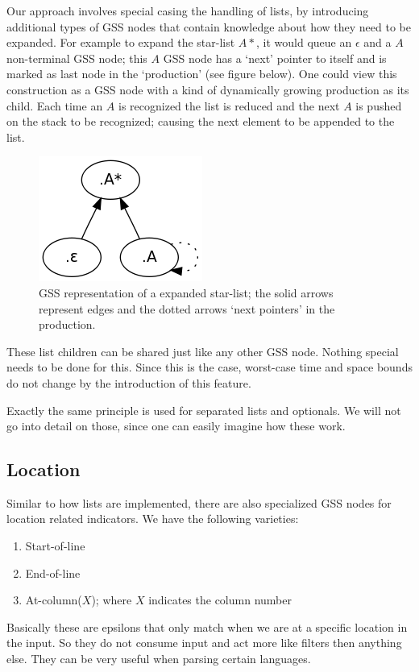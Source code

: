 \documentclass[a4paper,10pt]{article}
\begin{document}
Our approach involves special casing the handling of lists, by introducing additional types of GSS nodes that contain knowledge about how they need to be expanded. For example to expand the star-list $A*$, it would queue an $\epsilon$ and a $A$ non-terminal GSS node; this $A$ GSS node has a `next' pointer to itself and is marked as last node in the `production' (see figure below). One could view this construction as a GSS node with a kind of dynamically growing production as its child. Each time an $A$ is recognized the list is reduced and the next $A$ is pushed on the stack to be recognized; causing the next element to be appended to the list.

\begin{figure}[H]
\centering
\includegraphics[scale=0.5]{star-list.png}
\caption{GSS representation of a expanded star-list; the solid arrows represent edges and the dotted arrows `next pointers' in the production.}
\end{figure}

\pagebreak
These list children can be shared just like any other GSS node. Nothing special needs to be done for this. Since this is the case, worst-case time and space bounds do not change by the introduction of this feature.

Exactly the same principle is used for separated lists and optionals. We will not go into detail on those, since one can easily imagine how these work.

\subsection{Location}

Similar to how lists are implemented, there are also specialized GSS nodes for location related indicators. We have the following varieties:
\begin{enumerate}
 \setlength{\itemsep}{0pt}
 \setlength{\parskip}{0pt}
 \setlength{\parsep}{0pt}
 
 \item Start-of-line
 \item End-of-line
 \item At-column($X$); where $X$ indicates the column number
\end{enumerate}
Basically these are epsilons that only match when we are at a specific location in the input. So they do not consume input and act more like filters then anything else. They can be very useful when parsing certain languages.
\end{document}
